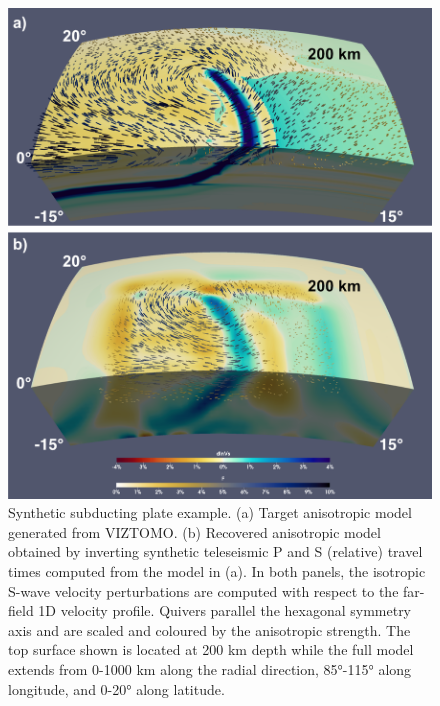 \begin{figure}[ht]
    \centering
    \includegraphics{PSI_D/PSI_D_Subduction.png}
    \caption{Synthetic subducting plate example. (a) Target anisotropic model generated from VIZTOMO. (b) Recovered anisotropic model obtained by inverting synthetic teleseismic P and S (relative) travel times computed from the model in (a). In both panels, the isotropic S-wave velocity perturbations are computed with respect to the far-field 1D velocity profile. Quivers parallel the hexagonal symmetry axis and are scaled and coloured by the anisotropic strength. The top surface shown is located at 200 km depth while the full model extends from 0-1000 km along the radial direction, 85°-115° along longitude, and 0-20° along latitude.\\
    }
    \label{fig:psi_d_subduction}
\end{figure}




